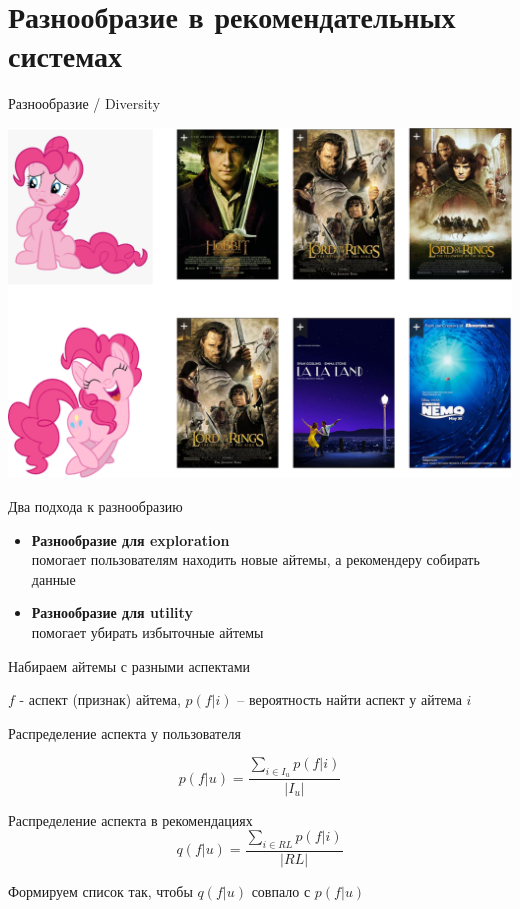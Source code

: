 \documentclass[11pt,aspectratio=169,handout]{beamer}
\begin{document}
\section{Разнообразие в рекомендательных системах}

\begin{frame}{Разнообразие / Diversity}

\begin{center}
\includegraphics[scale=0.22]{images/diversity.png}
\end{center}

\end{frame}

\begin{frame}{Два подхода к разнообразию}

\begin{itemize}
\item {\bf Разнообразие для exploration} \\
помогает пользователям находить новые айтемы, а рекомендеру собирать данные
\item {\bf Разнообразие для utility} \\
помогает убирать избыточные айтемы
\end{itemize}

\end{frame}

\begin{frame}{Набираем айтемы с разными аспектами}

$f$ - аспект (признак) айтема, $p(f | i)$ -- вероятность найти аспект у айтема $i$

\vfill

Распределение аспекта у пользователя

\[
p(f | u) = \frac{\sum_{i \in I_u} p(f | i)}{|I_u|}  
\]

Распределение аспекта в рекомендациях
\[
q(f | u) = \frac{\sum_{i \in RL} p(f | i)}{|RL|}
\]

\begin{tcolorbox}[colback=info!5,colframe=info!80,title=]
Формируем список так, чтобы $q(f | u)$ совпало с $p(f | u)$
\end{tcolorbox}

\end{frame}
\end{document}
